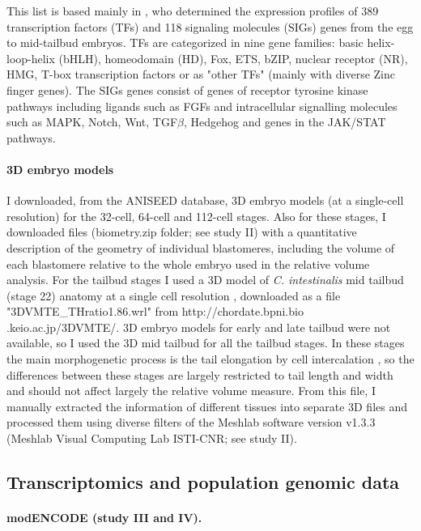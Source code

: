 This list is based mainly in \citet{Imai2004}, who determined the expression profiles of 389 transcription factors (TFs) and 118 signaling molecules (SIGs) genes from the egg to mid-tailbud embryos. TFs are categorized in nine gene families: basic helix-loop-helix (bHLH), homeodomain (HD), Fox, ETS, bZIP, nuclear receptor (NR), HMG, T-box transcription factors or as "other TFs" (mainly with diverse Zinc finger genes).
The SIGs genes consist of genes of receptor tyrosine kinase pathways including ligands such as FGFs and intracellular signalling molecules such as MAPK, Notch, Wnt, TGF$\beta$, Hedgehog and genes in the JAK/STAT pathways. 

\paragraph{3D embryo models}

I downloaded, from the ANISEED database, 3D embryo models (at a single-cell resolution) for the 32-cell, 64-cell and 112-cell stages. Also for these stages, I downloaded files (biometry.zip folder; see study II) with a quantitative description of the geometry of individual blastomeres, including the volume of each blastomere relative to the whole embryo \citep{Tassy2006} used in the relative volume analysis.
For the tailbud stages I used a 3D model of \textit{C. intestinalis} mid tailbud (stage 22) anatomy at a single cell resolution \citep{Nakamura2012}, downloaded as a file "3DVMTE\_THratio1.86.wrl" from http://chordate.bpni.bio .keio.ac.jp/3DVMTE/. 3D embryo models for early and late tailbud were not available, so I used the 3D mid tailbud for all the tailbud stages. In these stages the main morphogenetic process is the tail elongation by cell intercalation \citep{Hotta2007}, so the differences between these stages are largely restricted to tail length and width and should not affect largely the relative volume measure.
From this file, I manually extracted the information of different tissues into separate 3D files and processed them using diverse filters of the Meshlab software version v1.3.3 (Meshlab Visual Computing Lab ISTI-CNR; see study II).


\subsection{Transcriptomics and population genomic data}

\paragraph{modENCODE (study III and IV).}

